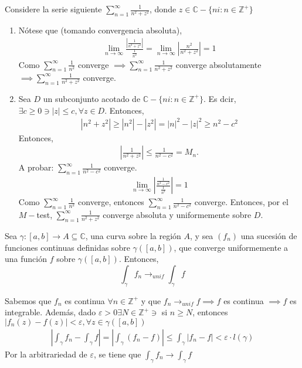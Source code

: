 \begin{ejemplo}
    Considere la serie siguiente $\sum_{n=1}^{\infty}\frac{1}{n^2+z^2}$, donde $z\in \mathbb{C}-\{ni:n\in \mathbb{Z}^+\}$
    \begin{enumerate}
        \item Nótese que (tomando convergencia absoluta), 
        \begin{align*}
            \lim_{n\to\infty}\frac{\left|\frac{1}{n^2+z^2}\right|}{\frac{1}{n^2}}=\lim_{n\to\infty}\left|\frac{n^2}{n^2+z^2}\right|=1
        \end{align*}
        Como $\sum_{n=1}^\infty \frac{1}{n^2}$ converge $\implies \sum_{n=1}^\infty\frac{1}{n^2+z^2}$ converge absolutamente $\implies \sum_{n=1}^\infty \frac{1}{n^2+z^2}$ converge.

        \item Sea $D$ un subconjunto acotado de $\mathbb{C}-\{ni:n\in\mathbb{Z}^+\}$. Es dcir, $\exists c\geq 0\ni |z|\leq c,\forall z\in D$. Entonces, 
        \begin{align*}
            |n^2+z^2|\geq |n^2|-|z^2|=|n|^2-|z|^2 \geq n^2-c^2
        \end{align*}
        Entonces, 
        \begin{align*}
            \left|\frac{1}{n^2+z^2}\right|\leq \frac{1}{n^2-c^2}=M_n.
        \end{align*}
        A probar: $\sum_{n=1}^\infty \frac{1}{n^2-c^2}$ converge. 
        \begin{align*}
            \lim_{n\to\infty}\left|\frac{\frac{1}{n^2-c^2}}{\frac{1}{n^2}}\right|=1
        \end{align*}
        Como $\sum_{n=1}^\infty\frac{1}{n^2}$ converge, entonces $\sum_{n=1}^{\infty}\frac{1}{n^2-c^2}$ converge. Entonces, por el $M-$test, $\sum_{n=1}^\infty \frac{1}{n^2+z^2}$ converge absoluta y uniformemente sobre $D$. 
    \end{enumerate}
\end{ejemplo}



\begin{prop}
    Sea $\gamma:[a,b]\to A\subseteq \mathbb{C}$, una curva sobre la región $A$, y sea $(f_n)$ una sucesión de funciones continuas definidas sobre $\gamma([a,b])$, que converge uniformemente a una función $f$ sobre $\gamma([a,b])$. Entonces, 
    $$\int_\gamma f_n\to_{unif} \int_{\gamma}f$$
    \begin{prop}
        Sabemos que $f_n$ es continua $\forall n\in \mathbb{Z}^+$ y que $f_n\to_{unif}f\implies f$ es continua $\implies f$ es integrable. Además, dado $\varepsilon>0\exists N\in\mathbb{Z}^+\ni$ si $n\geq N$, entonces $|f_n(z)-f(z)|<\varepsilon,\forall z\in \gamma([a,b])$
        \begin{align*}
            \left|\int_\gamma f_n-\int_\gamma f\right|=\left|\int_\gamma (f_n-f)\right|\leq \int_\gamma |f_n-f|<\varepsilon\cdot l(\gamma)
        \end{align*}
        Por la arbitrariedad de $\varepsilon$, se tiene que $\int_\gamma f_n\to \int_\gamma f$
    \end{prop}
\end{prop}

